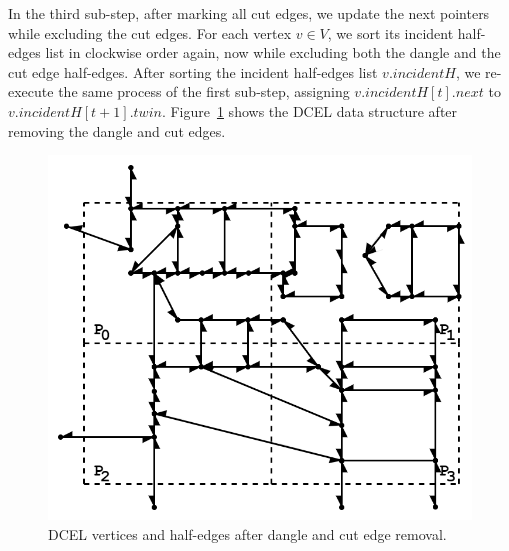 In the third sub-step, after marking all cut edges, we update the next pointers while excluding the cut edges. 
For each vertex $v \in V$, we sort its incident half-edges list in clockwise order again, now while excluding both the dangle and the cut edge half-edges.
After sorting the incident half-edges list $v.incidentH$, we re-execute the same process of the first sub-step, assigning $v.incidentH[t].next$ to $v.incidentH[t+1].twin$. 
Figure~\ref{fig:ddcel:step2} shows the DCEL data structure after removing the dangle and cut edges.


\begin{figure}[tb]
	\centering
	\includegraphics[width=0.75 \linewidth ]{model/ddcel-2.png}
	\caption[caption]{DCEL vertices and half-edges after dangle and cut edge removal.}
	\label{fig:ddcel:step2}
\end{figure}



